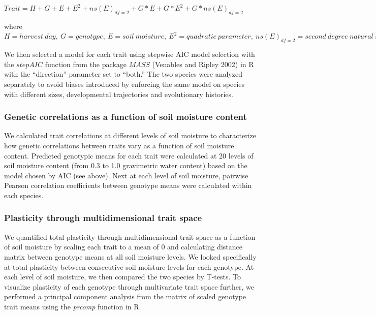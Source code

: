 \documentclass[jou,floatsintext]{apa6}
\begin{document}
\(Trait = H+G+E+E^2+ns(E)_{df=2}+G*E+G*E^2+G*ns(E)_{df=2}\)

where \(H = harvest\ day, \ G = genotype,\ E = soil\ moisture,\ E^2 = quadratic\ parameter,\ ns(E)_{df=2} = second\ degree\ natural\ spline\ parameter\)

We then selected a model for each trait using stepwise AIC model selection with the \(stepAIC\) function from the package \(MASS\) (Venables and Ripley 2002) in R with the \enquote{direction} parameter set to \enquote{both.} The two species were analyzed separately to avoid biases introduced by enforcing the same model on species with different sizes, developmental trajectories and evolutionary histories.

\hypertarget{genetic-correlations-as-a-function-of-soil-moisture-content}{%
\subsubsection{Genetic correlations as a function of soil moisture content}\label{genetic-correlations-as-a-function-of-soil-moisture-content}}

We calculated trait correlations at different levels of soil moisture to characterize how genetic correlations between traits vary as a function of soil moisture content. Predicted genotypic means for each trait were calculated at 20 levels of soil moisture content (from 0.3 to 1.0 gravimetric water content) based on the model chosen by AIC (see above). Next at each level of soil moisture, pairwise Pearson correlation coefficients between genotype means were calculated within each species.

\hypertarget{plasticity-through-multidimensional-trait-space}{%
\subsubsection{Plasticity through multidimensional trait space}\label{plasticity-through-multidimensional-trait-space}}

We quantified total plasticity through multidimensional trait space as a function of soil moisture by scaling each trait to a mean of 0 and calculating distance matrix between genotype means at all soil moisture levels. We looked specifically at total plasticity between consecutive soil moisture levels for each genotype. At each level of soil moisture, we then compared the two species by T-tests. To visualize plasticity of each genotype through multivariate trait space further, we performed a principal component analysis from the matrix of scaled genotype trait means using the \emph{prcomp} function in R.
\end{document}
